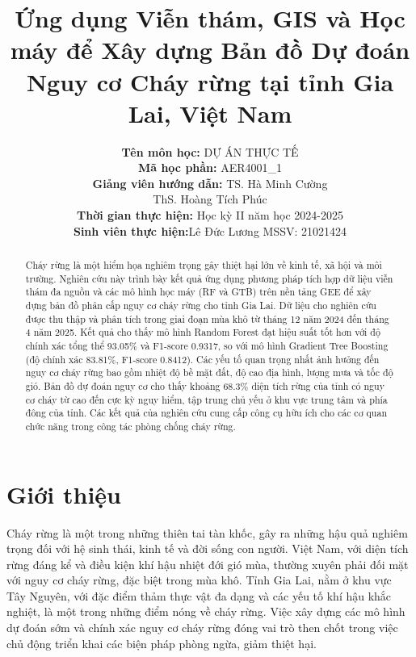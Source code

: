 \documentclass{article}
\author{
    \textbf{Tên môn học:} DỰ ÁN THỰC TẾ\\
    \textbf{Mã học phần:} AER4001\_1 \\
    \textbf{Giảng viên hướng dẫn:} TS. Hà Minh Cường \\
                                   ThS. Hoàng Tích Phúc\\
    \textbf{Thời gian thực hiện:} Học kỳ II năm học 2024-2025\\ 
    \textbf{Sinh viên thực hiện:}Lê Đức Lương \- MSSV: 21021424
}
\affil{Viện Công nghệ Hàng không Vũ trụ, Trường Đại học Công nghệ - Đại học Quốc gia Hà Nội, Hà Nội, Việt Nam} %
\affil[*]{Địa chỉ liên hệ: luongoc130603@gmail.com} %
\title{Ứng dụng Viễn thám, GIS và Học máy để Xây dựng Bản đồ Dự đoán Nguy cơ Cháy rừng tại tỉnh Gia Lai, Việt Nam} %
\date{} %
\begin{document}

\maketitle %

\begin{abstract}
    Cháy rừng là một hiểm họa nghiêm trọng gây thiệt hại lớn về kinh tế, xã hội và môi trường. Nghiên cứu này trình bày kết quả ứng dụng phương pháp tích hợp dữ liệu viễn thám đa nguồn và các mô hình học máy (RF và GTB) trên nền tảng GEE để xây dựng bản đồ phân cấp nguy cơ cháy rừng cho tỉnh Gia Lai. Dữ liệu cho nghiên cứu được thu thập và phân tích trong giai đoạn mùa khô từ tháng 12 năm 2024 đến tháng 4 năm 2025. Kết quả cho thấy mô hình Random Forest đạt hiệu suất tốt hơn với độ chính xác tổng thể 93.05\% và F1-score 0.9317, so với mô hình Gradient Tree Boosting (độ chính xác 83.81\%, F1-score 0.8412). Các yếu tố quan trọng nhất ảnh hưởng đến nguy cơ cháy rừng bao gồm nhiệt độ bề mặt đất, độ cao địa hình, lượng mưa và tốc độ gió. Bản đồ dự đoán nguy cơ cho thấy khoảng 68.3\% diện tích rừng của tỉnh có nguy cơ cháy từ cao đến cực kỳ nguy hiểm, tập trung chủ yếu ở khu vực trung tâm và phía đông của tỉnh. Các kết quả của nghiên cứu cung cấp công cụ hữu ích cho các cơ quan chức năng trong công tác phòng chống cháy rừng. 
\end{abstract} %

\section{Giới thiệu} %
Cháy rừng là một trong những thiên tai tàn khốc, gây ra những hậu quả nghiêm trọng đối với hệ sinh thái, kinh tế và đời sống con người. Việt Nam, với diện tích rừng đáng kể và điều kiện khí hậu nhiệt đới gió mùa, thường xuyên phải đối mặt với nguy cơ cháy rừng, đặc biệt trong mùa khô. Tỉnh Gia Lai, nằm ở khu vực Tây Nguyên, với đặc điểm thảm thực vật đa dạng và các yếu tố khí hậu khắc nghiệt, là một trong những điểm nóng về cháy rừng. Việc xây dựng các mô hình dự đoán sớm và chính xác nguy cơ cháy rừng đóng vai trò then chốt trong việc chủ động triển khai các biện pháp phòng ngừa, giảm thiệt hại.
\end{document}
